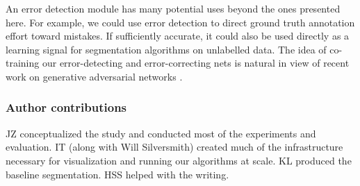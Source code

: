 \documentclass{article}
\begin{document}
An error detection module has many potential uses beyond the ones presented
here. For example, we could use error detection to direct ground truth
annotation effort toward mistakes. If sufficiently accurate, it could also be
used directly as a learning signal for segmentation algorithms on unlabelled
data. The idea of co-training our error-detecting and error-correcting nets is
natural in view of recent work on generative adversarial networks
\cite{cgan1,cgan2}.




\newpage \subsubsection*{Author contributions}
JZ conceptualized the study and conducted most of the experiments and
evaluation. IT (along with Will Silversmith) created much of the infrastructure
necessary for visualization and running our algorithms at scale. KL produced the
baseline segmentation. HSS helped with the writing.
\end{document}
